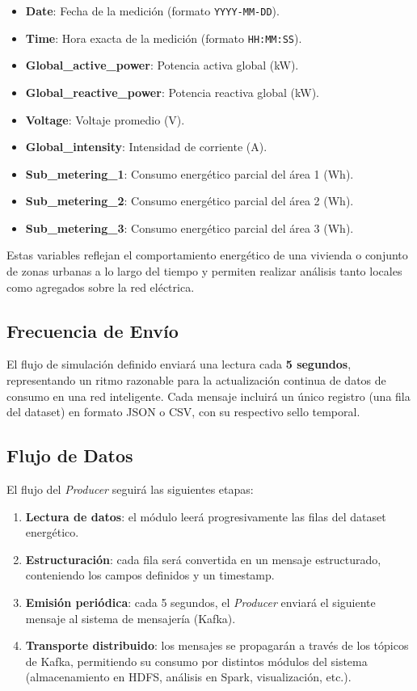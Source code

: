 \documentclass[12pt,a4paper]{article}
\begin{document}
\begin{itemize}
    \item \textbf{Date}: Fecha de la medición (formato \texttt{YYYY-MM-DD}).
    \item \textbf{Time}: Hora exacta de la medición (formato \texttt{HH:MM:SS}).
    \item \textbf{Global\_active\_power}: Potencia activa global (kW).
    \item \textbf{Global\_reactive\_power}: Potencia reactiva global (kW).
    \item \textbf{Voltage}: Voltaje promedio (V).
    \item \textbf{Global\_intensity}: Intensidad de corriente (A).
    \item \textbf{Sub\_metering\_1}: Consumo energético parcial del área 1 (Wh).
    \item \textbf{Sub\_metering\_2}: Consumo energético parcial del área 2 (Wh).
    \item \textbf{Sub\_metering\_3}: Consumo energético parcial del área 3 (Wh).
\end{itemize}

Estas variables reflejan el comportamiento energético de una vivienda o conjunto de zonas urbanas a lo largo del tiempo y permiten realizar análisis tanto locales como agregados sobre la red eléctrica.

\subsection{Frecuencia de Envío}
El flujo de simulación definido enviará una lectura cada \textbf{5 segundos}, representando un ritmo razonable para la actualización continua de datos de consumo en una red inteligente. Cada mensaje incluirá un único registro (una fila del dataset) en formato JSON o CSV, con su respectivo sello temporal.

\subsection{Flujo de Datos}
El flujo del \textit{Producer} seguirá las siguientes etapas:
\begin{enumerate}
    \item \textbf{Lectura de datos}: el módulo leerá progresivamente las filas del dataset energético.
    \item \textbf{Estructuración}: cada fila será convertida en un mensaje estructurado, conteniendo los campos definidos y un timestamp.
    \item \textbf{Emisión periódica}: cada 5 segundos, el \textit{Producer} enviará el siguiente mensaje al sistema de mensajería (Kafka).
    \item \textbf{Transporte distribuido}: los mensajes se propagarán a través de los tópicos de Kafka, permitiendo su consumo por distintos módulos del sistema (almacenamiento en HDFS, análisis en Spark, visualización, etc.).
\end{enumerate}
\end{document}
